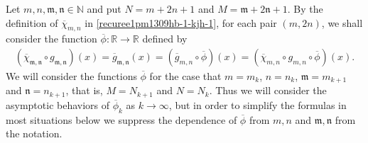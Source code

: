 \documentclass[12pt]{amsart}
\numberwithin{equation}{section}
\begin{document}
Let $m,n,\mathfrak{m},\mathfrak{n}\in \mathbb{N}$ and put $N=m+2n+1$ and $M=\mathfrak{m}+2\mathfrak{n}+1$. By the definition of $\overline{\chi}_{m,n}$ in \eqref{recuree1pm1309hb-1-kjh-1}, for each pair $(m,2n)$, we shall consider the function $\overline{\phi}:\mathbb{R}\to\mathbb{R}$ defined by
\begin{equation}\label{diffeo}
\begin{split}
(\overline{\chi}_{\mathfrak{m},\mathfrak{n}}\circ g_{\mathfrak{m},\mathfrak{n}})(x)=\overline{g}_{\mathfrak{m},\mathfrak{n}}(x)=(\overline{g}_{m,n}\circ\overline{\phi})(x)=(\overline{\chi}_{m,n}\circ g_{m,n}\circ\overline{\phi})(x).
\end{split}
\end{equation}
We will consider the functions $\overline{\phi}$ for the case that $m=m_k$, $n=n_k$, $\mathfrak{m}=m_{k+1}$ and $\mathfrak{n}=n_{k+1}$, that is, $M=N_{k+1}$ and $N=N_k$. Thus we will consider the asymptotic behaviors of $\overline{\phi}_k$ as $k\to\infty$, but in order to simplify the formulas in most situations below we suppress the dependence of $\overline{\phi}$ from $m,n$ and $\mathfrak{m},\mathfrak{n}$ from the notation.
\end{document}
